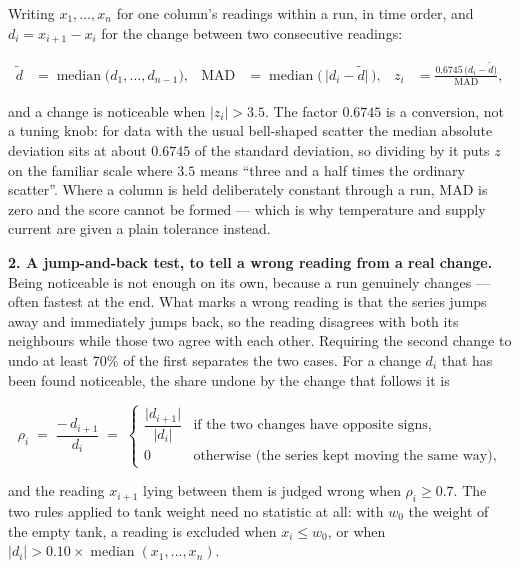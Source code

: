 \documentclass[11pt,a4paper]{article}
\begin{document}
Writing $x_1,\dots,x_n$ for one column's readings within a run, in time order, and
$d_i = x_{i+1} - x_i$ for the change between two consecutive readings:

\begin{align}
\tilde{d} &= \operatorname{median}\bigl(d_1,\dots,d_{n-1}\bigr),
&
\mathrm{MAD} &= \operatorname{median}\bigl(\,\lvert d_i - \tilde{d}\rvert\,\bigr),
&
z_i &= \frac{0.6745\,\bigl(d_i - \tilde{d}\bigr)}{\mathrm{MAD}},
\end{align}

and a change is noticeable when $\lvert z_i \rvert > 3.5$. The factor $0.6745$ is a conversion,
not a tuning knob: for data with the usual bell-shaped scatter the median absolute deviation
sits at about $0.6745$ of the standard deviation, so dividing by it puts $z$ on the familiar
scale where $3.5$ means ``three and a half times the ordinary scatter''. Where a column is held
deliberately constant through a run, $\mathrm{MAD}$ is zero and the score cannot be formed ---
which is why temperature and supply current are given a plain tolerance instead.

\textbf{2. A jump-and-back test, to tell a wrong reading from a real change.} Being noticeable
is not enough on its own, because a run genuinely changes --- often fastest at the end. What
marks a wrong reading is that the series jumps away and immediately jumps back, so the reading
disagrees with both its neighbours while those two agree with each other. Requiring the second
change to undo at least 70\% of the first separates the two cases. For a change $d_i$ that has
been found noticeable, the share undone by the change that follows it is

\begin{equation}
\rho_i \;=\; \frac{-\,d_{i+1}}{d_i}
\;=\;
\begin{cases}
\dfrac{\lvert d_{i+1}\rvert}{\lvert d_i \rvert} & \text{if the two changes have opposite signs},\\[0.9em]
0 & \text{otherwise (the series kept moving the same way)},
\end{cases}
\end{equation}

and the reading $x_{i+1}$ lying between them is judged wrong when $\rho_i \geq 0.7$. The two
rules applied to tank weight need no statistic at all: with $w_0$ the weight of the empty tank,
a reading is excluded when $x_i \leq w_0$, or when
$\lvert d_i \rvert > 0.10 \times \operatorname{median}(x_1,\dots,x_n)$.
\end{document}
